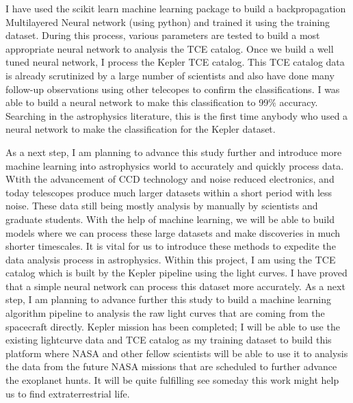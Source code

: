 I have used the scikit learn machine learning package to build a backpropagation Multilayered Neural network (using python) and trained it using the training dataset. During this process, various parameters are tested to build a most appropriate neural network to analysis the TCE catalog. Once we build a well tuned neural network, I process the Kepler TCE catalog. This TCE catalog data is already scrutinized by a large number of scientists and also have done many follow-up observations using other telecopes to confirm the classifications. I was able to build a neural network to make this classification to 99$\%$ accuracy. Searching in the astrophysics literature, this is the first time anybody who used a neural network to make the classification for the Kepler dataset. 


As a next step, I am planning to advance this study further and introduce more machine learning into astrophysics world to accurately and quickly process data. Wtith the advancement of CCD technology and noise reduced electronics, and today telescopes produce much larger datasets within a short period with less noise. These data still being mostly analysis by manually by scientists and graduate students. With the help of machine learning, we will be able to build models where we can process these large datasets and make discoveries in much shorter timescales. It is vital for us to introduce these methods to expedite the data analysis process in astrophysics. Within this project, I am using the TCE catalog which is built by the Kepler pipeline using the light curves. I have proved that a simple neural network can process this dataset more accurately. As a next step, I am planning to advance further this study to build a machine learning algorithm pipeline to analysis the raw light curves that are coming from the spacecraft directly. Kepler mission has been completed; I will be able to use the existing lightcurve data and TCE catalog as my training dataset to build this platform where NASA and other fellow scientists will be able to use it to analysis the data from the future NASA missions that are scheduled to further advance the exoplanet hunts. It will be quite fulfilling see someday this work might help us to find extraterrestrial life. 